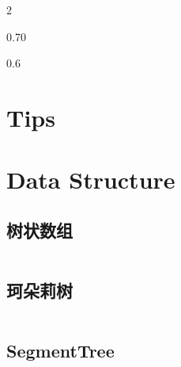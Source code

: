 	\begin{multicols}{2}
		\setcounter{tocdepth}{3}
		\begingroup
		\let\cleardoublepage\relax
		\let\clearpage\relax
		\begin{small}
		\begin{spacing}{0.70}
		\tableofcontents
		\end{spacing}
		\end{small}
		\newpage
		\begin{spacing}{0.6}


			\section{Tips}
				



			\section{Data Structure}
				\subsection{树状数组}
					\inputminted{cpp}{DataStructure/BIT.cpp}
				\subsection{珂朵莉树}
					\inputminted{cpp}{DataStructure/odt.cpp}
				\subsection{SegmentTree}
					
			



\end{spacing}
\end{multicols}
